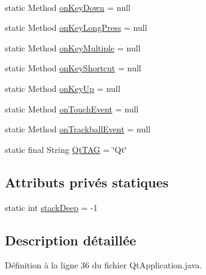 \begin{DoxyCompactItemize}
$$\item 
static Method \hyperlink{classorg_1_1qtproject_1_1qt5_1_1android_1_1bindings_1_1_qt_application_a399e0ef76371331edc6aca47b4936dc6}{on\-Key\-Down} = null
\item 
static Method \hyperlink{classorg_1_1qtproject_1_1qt5_1_1android_1_1bindings_1_1_qt_application_abe105cb7eb9d98af229bcc706ad7660b}{on\-Key\-Long\-Press} = null
\item 
static Method \hyperlink{classorg_1_1qtproject_1_1qt5_1_1android_1_1bindings_1_1_qt_application_a7098736b29503c41026ff60cca904094}{on\-Key\-Multiple} = null
\item 
static Method \hyperlink{classorg_1_1qtproject_1_1qt5_1_1android_1_1bindings_1_1_qt_application_a1ce0a33219f8c6103b216ed433ceeefe}{on\-Key\-Shortcut} = null
\item 
static Method \hyperlink{classorg_1_1qtproject_1_1qt5_1_1android_1_1bindings_1_1_qt_application_a947623196f7f382c1c2bf0737697082d}{on\-Key\-Up} = null
\item 
static Method \hyperlink{classorg_1_1qtproject_1_1qt5_1_1android_1_1bindings_1_1_qt_application_ad8a6d1d7da859063ec8e5ba5b3db06c1}{on\-Touch\-Event} = null
\item 
static Method \hyperlink{classorg_1_1qtproject_1_1qt5_1_1android_1_1bindings_1_1_qt_application_aba0550a56d08380fb00cef9cc1a276d1}{on\-Trackball\-Event} = null
\item 
static final String \hyperlink{classorg_1_1qtproject_1_1qt5_1_1android_1_1bindings_1_1_qt_application_acf8f3131e19aaef5fc2079bc530f42d6}{Qt\-T\-A\-G} = \char`\"{}Qt\char`\"{}
\end{DoxyCompactItemize}
\subsection*{Attributs privés statiques}
\begin{DoxyCompactItemize}
\item 
static int \hyperlink{classorg_1_1qtproject_1_1qt5_1_1android_1_1bindings_1_1_qt_application_aaf646148d88d3e301dab76cd7e4e0c04}{stack\-Deep} = -\/1
\end{DoxyCompactItemize}


\subsection{Description détaillée}


Définition à la ligne 36 du fichier Qt\-Application.\-java.



